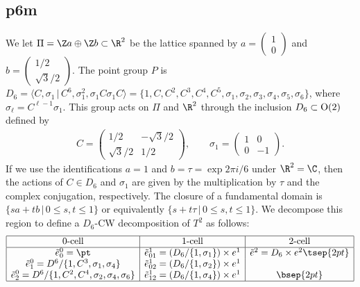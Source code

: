 \subsection{\textsf{p6m}}\label{subsec:p6m}

We let $\Pi = \Z a \oplus \Z b \subset \R^2$ be the lattice spanned by
$a = \left( \begin{matrix} 1 \\ 0 \end{matrix} \right)$ and
$b = \left( \begin{matrix} 1/2 \\ \sqrt{3}/2 \end{matrix} \right)$.
The point group $P$ is
$D_6 =\langle C, \sigma_1 \,|\, C^6, \sigma_1^2, \sigma_1C\sigma_1C \rangle=
\{1, C, C^2, C^3, C^4, C^5,\sigma_1, \sigma_2, \sigma_3, \sigma_4, \sigma_5, \sigma_6\}$, where $\sigma_\ell = C^{\ell - 1}\sigma_1$. This group acts on $\Pi$ and $\R^2$ through the inclusion $D_6 \subset {\rm O}(2)$ def\/ined by
\begin{gather*}
C = \left(
\begin{matrix}
1/2 & -\sqrt{3}/2 \\
\sqrt{3}/2 & 1/2
\end{matrix}
\right), \qquad \sigma_1 =
\left(
\begin{matrix}
1 & 0 \\
0 & -1
\end{matrix}
\right).
\end{gather*}
If we use the identif\/ications $a = 1$ and $b = \tau = \exp 2\pi i/6$ under $\R^2 = \C$, then the actions of $C \in D_6$ and $\sigma_1$ are given by the multiplication by $\tau$ and the complex conjugation, respectively. The closure of a fundamental domain is $\{ s a + t b \,|\, 0 \le s, t \le 1 \}$ or equivalently $\{ s + t \tau \,|\, 0 \le s, t \le 1 \}$. We decompose this region to def\/ine a $D_6$-CW decomposition of $T^2$ as follows:
$$
\begin{array}{|c|c|c|}
\hline
\mbox{0-cell} & \mbox{1-cell} & \mbox{2-cell} \\
\hline
\tilde{e}^0_0 = \pt &
\tilde{e}^1_{01} = (D_6/\{ 1, \sigma_1 \}) \times e^1 &
\tilde{e}^2 = D_6 \times e^2 \tsep{2pt}\\
\tilde{e}^0_1 = D^6/\{ 1, C^3, \sigma_1, \sigma_4 \} &
\tilde{e}^1_{02} = (D_6/\{ 1, \sigma_2 \}) \times e^1 & \\
\tilde{e}^0_2 = D^6/\{ 1, C^2, C^4, \sigma_2, \sigma_4, \sigma_6 \} &
\tilde{e}^1_{12} = (D_6/\{ 1, \sigma_4 \}) \times e^1 & \bsep{2pt}\\
\hline
\end{array}
$$

